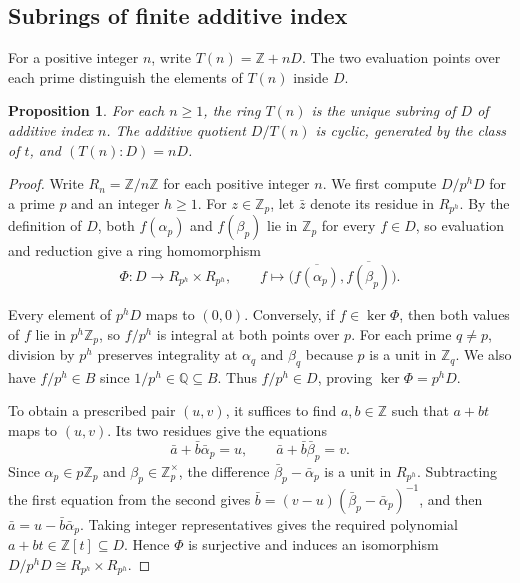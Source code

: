 \documentclass{article}
\newtheorem{proposition}{Proposition}[section]
\theoremstyle{remark}
\begin{document}
\subsection{Subrings of finite additive index}

For a positive integer $n$, write $T(n) = \mathbb{Z} + nD$.
The two evaluation points over each prime distinguish the elements of $T(n)$ inside $D$.

\begin{proposition}
    \label{prop:subrings-finite-index}
    For each $n \ge 1$, the ring $T(n)$ is the unique subring of $D$ of additive index $n$.
    The additive quotient $D/T(n)$ is cyclic, generated by the class of $t$, and $(T(n) : D) = nD$.
\end{proposition}

\begin{proof}
    Write $R_n = \mathbb{Z}/n\mathbb{Z}$ for each positive integer $n$.
    We first compute $D/p^hD$ for a prime $p$ and an integer $h \ge 1$.
    For $z \in \mathbb{Z}_p$, let $\bar{z}$ denote its residue in $R_{p^h}$.
    By the definition of $D$, both $f(\alpha_p)$ and $f(\beta_p)$ lie in $\mathbb{Z}_p$ for every $f \in D$, so evaluation and reduction give a ring homomorphism
    \[
        \Phi \colon D \longrightarrow R_{p^h} \times R_{p^h},
        \qquad f \longmapsto \bigl(\overline{f(\alpha_p)}, \overline{f(\beta_p)}\bigr).
    \]

    Every element of $p^hD$ maps to $(0, 0)$.
    Conversely, if $f \in \ker \Phi$, then both values of $f$ lie in $p^h\mathbb{Z}_p$, so $f/p^h$ is integral at both points over $p$.
    For each prime $q \ne p$, division by $p^h$ preserves integrality at $\alpha_q$ and $\beta_q$ because $p$ is a unit in $\mathbb{Z}_q$.
    We also have $f/p^h \in B$ since $1/p^h \in \mathbb{Q} \subseteq B$.
    Thus $f/p^h \in D$, proving $\ker \Phi = p^hD$.

    To obtain a prescribed pair $(u, v)$, it suffices to find $a, b \in \mathbb{Z}$ such that $a + bt$ maps to $(u, v)$.
    Its two residues give the equations
    \[
        \bar{a} + \bar{b}\bar{\alpha}_p = u, \qquad
        \bar{a} + \bar{b}\bar{\beta}_p = v.
    \]
    Since $\alpha_p \in p\mathbb{Z}_p$ and $\beta_p \in \mathbb{Z}_p^\times$, the difference $\bar{\beta}_p - \bar{\alpha}_p$ is a unit in $R_{p^h}$.
    Subtracting the first equation from the second gives $\bar{b} = (v - u)(\bar{\beta}_p - \bar{\alpha}_p)^{-1}$, and then $\bar{a} = u - \bar{b}\bar{\alpha}_p$.
    Taking integer representatives gives the required polynomial $a + bt \in \mathbb{Z}[t] \subseteq D$.
    Hence $\Phi$ is surjective and induces an isomorphism $D/p^hD \cong R_{p^h} \times R_{p^h}$.


\end{proof}
\end{document}
